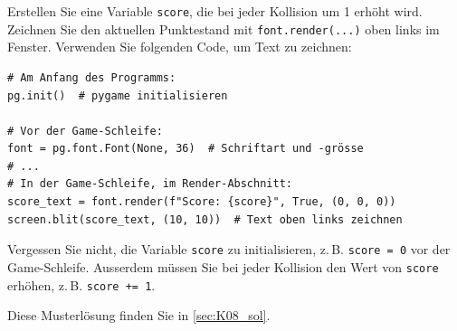 \begin{myexercise}\label{myexercise:Highscore}
    Erstellen Sie eine Variable \lstinline|score|, die bei jeder Kollision um 1 erhöht wird. Zeichnen Sie den aktuellen Punktestand mit \lstinline|font.render(...)| oben links im Fenster. Verwenden Sie folgenden Code, um Text zu zeichnen:
    \begin{lstlisting}
# Am Anfang des Programms:
pg.init()  # pygame initialisieren

# Vor der Game-Schleife:
font = pg.font.Font(None, 36)  # Schriftart und -grösse
# ...
# In der Game-Schleife, im Render-Abschnitt:
score_text = font.render(f"Score: {score}", True, (0, 0, 0))
screen.blit(score_text, (10, 10))  # Text oben links zeichnen
\end{lstlisting}
Vergessen Sie nicht, die Variable \lstinline|score| zu initialisieren, z.\,B. \lstinline|score = 0| vor der Game-Schleife. Ausserdem müssen Sie bei jeder Kollision den Wert von \lstinline|score| erhöhen, z.\,B. \lstinline|score += 1|.
	\begin{myanswer}
		Diese Musterlösung finden Sie in \cref{sec:K08_sol}.
	\end{myanswer}
\end{myexercise}

